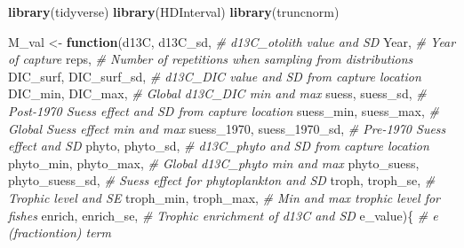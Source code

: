 \documentclass[]{article}
\title{}
\author{}
\date{}
\newenvironment{Shaded}{\begin{snugshade}}{\end{snugshade}}
\newcommand{\CommentTok}[1]{\textcolor[rgb]{0.56,0.35,0.01}{\textit{#1}}}
\newcommand{\ControlFlowTok}[1]{\textcolor[rgb]{0.13,0.29,0.53}{\textbf{#1}}}
\newcommand{\DecValTok}[1]{\textcolor[rgb]{0.00,0.00,0.81}{#1}}
\newcommand{\KeywordTok}[1]{\textcolor[rgb]{0.13,0.29,0.53}{\textbf{#1}}}
\newcommand{\NormalTok}[1]{#1}
\newcommand{\StringTok}[1]{\textcolor[rgb]{0.31,0.60,0.02}{#1}}
\begin{document}
\begin{Shaded}
\begin{Highlighting}[]
\KeywordTok{library}\NormalTok{(tidyverse)}
\KeywordTok{library}\NormalTok{(HDInterval)}
\KeywordTok{library}\NormalTok{(truncnorm)}

\NormalTok{M_val <-}\StringTok{ }\ControlFlowTok{function}\NormalTok{(d13C, d13C_sd, }
                  \CommentTok{# d13C_otolith value and SD}
\NormalTok{                  Year, }
                  \CommentTok{# Year of capture}
\NormalTok{                  reps, }
                  \CommentTok{# Number of repetitions when sampling from distributions}
\NormalTok{                  DIC_surf, DIC_surf_sd, }
                  \CommentTok{# d13C_DIC value and SD from capture location}
\NormalTok{                  DIC_min, DIC_max, }
                  \CommentTok{# Global d13C_DIC min and max}
\NormalTok{                  suess, suess_sd, }
                  \CommentTok{# Post-1970 Suess effect and SD from capture location}
\NormalTok{                  suess_min, suess_max, }
                  \CommentTok{# Global Suess effect min and max}
\NormalTok{                  suess_}\DecValTok{1970}\NormalTok{, suess_}\DecValTok{1970}\NormalTok{_sd, }
                  \CommentTok{# Pre-1970 Suess effect and SD}
\NormalTok{                  phyto, phyto_sd, }
                  \CommentTok{# d13C_phyto and SD from capture location}
\NormalTok{                  phyto_min, phyto_max, }
                  \CommentTok{# Global d13C_phyto min and max}
\NormalTok{                  phyto_suess, phyto_suess_sd, }
                  \CommentTok{# Suess effect for phytoplankton and SD}
\NormalTok{                  troph, troph_se,}
                  \CommentTok{# Trophic level and SE}
\NormalTok{                  troph_min, troph_max, }
                  \CommentTok{# Min and max trophic level for fishes}
\NormalTok{                  enrich, enrich_se, }
                  \CommentTok{# Trophic enrichment of d13C and SD}
\NormalTok{                  e_value)\{ }\CommentTok{# e (fractiontion) term}
  

\end{Highlighting}
\end{Shaded}
\end{document}
